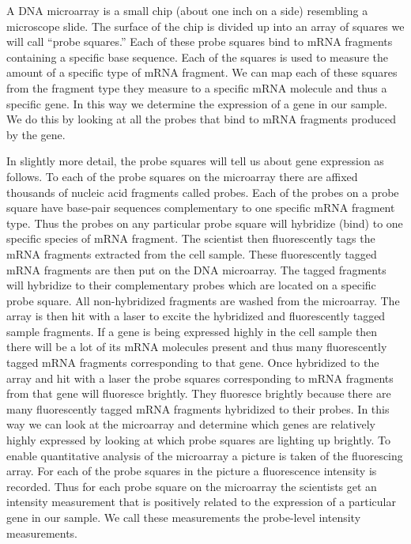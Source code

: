 \documentclass[reqno,12pt,oneside]{report}\usepackage[]{graphicx}\usepackage[]{color}
\theoremstyle{plain}
\theoremstyle{definition}
\theoremstyle{remark}
\numberwithin{theorem}{chapter}     %
\begin{document}
A DNA microarray is a small chip (about one inch on a side) resembling a microscope slide. The surface of the chip is divided up into an array of squares we will call ``probe squares.'' Each of these probe squares bind to  mRNA fragments containing a specific base sequence. Each of the squares is used to measure the amount of a specific type of mRNA fragment. We can map each of these squares from the fragment type they measure to a specific mRNA molecule and thus a specific gene. In this way we determine the expression of a gene in our sample. We do this by looking at all the probes that bind to mRNA fragments produced by the gene. 

In slightly more detail, the probe squares will tell us about gene expression as follows. To each of the probe squares on the microarray there are affixed thousands of nucleic acid fragments called probes. Each of the probes on a probe square have base-pair sequences complementary to one specific mRNA fragment type. Thus the probes on any particular probe square will hybridize (bind) to one specific species of mRNA fragment. The scientist then fluorescently tags the mRNA fragments extracted from the cell sample. These fluorescently tagged mRNA fragments are then put on the DNA microarray. The tagged fragments will hybridize to their complementary probes which are located on a specific probe square. All non-hybridized fragments are washed from the microarray. The array is then hit with a laser to excite the hybridized and fluorescently tagged sample fragments. If a gene is being expressed highly in the cell sample then there will be a lot of its mRNA molecules present and thus many fluorescently tagged mRNA fragments corresponding to that gene. Once hybridized to the array and hit with a laser the probe squares corresponding to mRNA fragments from that gene will fluoresce brightly. They fluoresce brightly because there are many fluorescently tagged mRNA  fragments hybridized to their probes. In this way we can look at the microarray and determine which genes are relatively highly expressed by looking at which probe squares are lighting up brightly. To enable quantitative analysis of the microarray a picture is taken of the fluorescing array. For each of the probe squares in the picture a fluorescence intensity is recorded. Thus for each probe square on the microarray the scientists get an intensity measurement that is positively related to the expression of a particular gene in our sample. We call these measurements the probe-level intensity measurements. 
\end{document}
